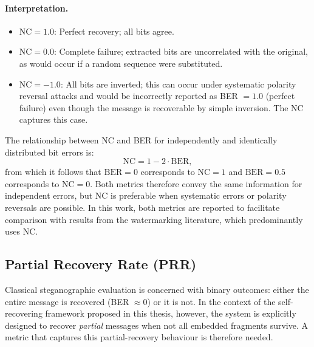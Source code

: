 \documentclass[12pt,a4paper,oneside]{report}
\begin{document}
	\paragraph{Interpretation.}
	\begin{itemize}
		\item $\mathrm{NC} = 1.0$: Perfect recovery; all bits agree.
		\item $\mathrm{NC} = 0.0$: Complete failure; extracted bits are uncorrelated with the
		original, as would occur if a random sequence were substituted.
		\item $\mathrm{NC} = -1.0$: All bits are inverted; this can occur under systematic polarity
		reversal attacks and would be incorrectly reported as BER $= 1.0$ (perfect failure) even
		though the message is recoverable by simple inversion. The NC captures this case.
	\end{itemize}
	
	The relationship between NC and BER for independently and identically distributed bit errors is:
	\begin{equation}
		\mathrm{NC} = 1 - 2 \cdot \mathrm{BER},
		\label{eq:nc_ber_relationship}
	\end{equation}
	from which it follows that $\mathrm{BER} = 0$ corresponds to $\mathrm{NC} = 1$ and
	$\mathrm{BER} = 0.5$ corresponds to $\mathrm{NC} = 0$. Both metrics therefore convey the same
	information for independent errors, but NC is preferable when systematic errors or polarity
	reversals are possible. In this work, both metrics are reported to facilitate comparison with
	results from the watermarking literature, which predominantly uses NC.
	
	\subsection{Partial Recovery Rate (PRR)}
	\label{subsec:prr}
	
	Classical steganographic evaluation is concerned with binary outcomes: either the entire message
	is recovered (BER $\approx 0$) or it is not. In the context of the self-recovering framework
	proposed in this thesis, however, the system is explicitly designed to recover \emph{partial}
	messages when not all embedded fragments survive. A metric that captures this partial-recovery
	behaviour is therefore needed.
	
\end{document}

